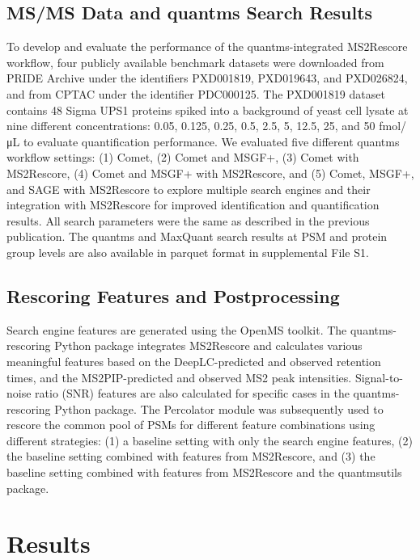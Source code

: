 \documentclass[12pt]{article}
\begin{document}
\subsection{MS/MS Data and quantms Search Results}
To develop and evaluate the performance of the quantms-integrated MS2Rescore workflow, four publicly available benchmark datasets were downloaded from PRIDE Archive under the identifiers PXD001819, PXD019643, and PXD026824, and from CPTAC under the identifier PDC000125. The PXD001819 dataset contains 48 Sigma UPS1 proteins spiked into a background of yeast cell lysate at nine different concentrations: 0.05, 0.125, 0.25, 0.5, 2.5, 5, 12.5, 25, and 50 fmol/μL to evaluate quantification performance. We evaluated five different quantms workflow settings: (1) Comet, (2) Comet and MSGF+, (3) Comet with MS2Rescore, (4) Comet and MSGF+ with MS2Rescore, and (5) Comet, MSGF+, and SAGE with MS2Rescore to explore multiple search engines and their integration with MS2Rescore for improved identification and quantification results. All search parameters were the same as described in the previous publication. The quantms and MaxQuant search results at PSM and protein group levels are also available in parquet format in supplemental File S1.

\subsection{Rescoring Features and Postprocessing}
Search engine features are generated using the OpenMS toolkit. The quantms-rescoring Python package integrates MS2Rescore and calculates various meaningful features based on the DeepLC-predicted and observed retention times, and the MS2PIP-predicted and observed MS2 peak intensities. Signal-to-noise ratio (SNR) features are also calculated for specific cases in the quantms-rescoring Python package. The Percolator module was subsequently used to rescore the common pool of PSMs for different feature combinations using different strategies: (1) a baseline setting with only the search engine features, (2) the baseline setting combined with features from MS2Rescore, and (3) the baseline setting combined with features from MS2Rescore and the quantmsutils package.

\section{Results}
\end{document}
